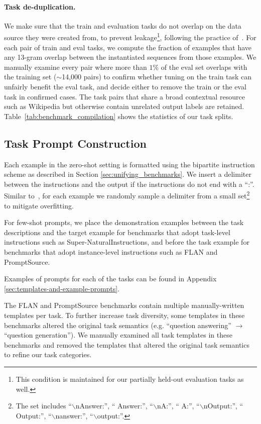 \paragraph{Task de-duplication.} We make sure that the train and evaluation tasks do not overlap on the data source they were created from, to prevent leakage\footnote{This condition is maintained for our partially held-out evaluation tasks as well.}, following the practice of~\cite{wang2022niv2}. For each pair of train and eval tasks, we compute the fraction of examples that have any 13-gram overlap between the instantiated sequences from those examples. We manually examine every pair where more than $1\%$ of the eval set overlaps with the training set ($\sim$14,000 pairs) to confirm whether tuning on the train task can unfairly benefit the eval task, and decide either to remove the train or the eval task in confirmed cases. The task pairs that share a broad contextual resource such as Wikipedia but otherwise contain unrelated output labels are retained. Table~\ref{tab:benchmark_compilation} shows the statistics of our task splits.

\subsection{Task Prompt Construction}

Each example in the zero-shot setting is formatted using the bipartite instruction scheme as described in Section \ref{sec:unifying_benchmarks}. We insert a delimiter between the instructions and the output if the instructions do not end with a ``:''. Similar to~\cite{chung2022flanpalm}, for each example we randomly sample a delimiter from a small set\footnote{The set includes ``$\backslash$nAnswer:'', `` Answer:'', ``$\backslash$nA:'', `` A:'', ``$\backslash$nOutput:'', `` Output:'', ``$\backslash$nanswer:'', ``$\backslash$output:''.} to mitigate overfitting. 

For few-shot prompts, we place the demonstration examples between the task descriptions and the target example for benchmarks that adopt task-level instructions such as Super-NaturalInstructions, and before the task example for benchmarks that adopt instance-level instructions such as FLAN and PromptSource.

Examples of prompts for each of the tasks can be found in Appendix \ref{sec:templates-and-example-prompts}.

The FLAN and PromptSource benchmarks contain multiple manually-written templates per task. To further increase task diversity, some templates in these benchmarks altered the original task semantics (e.g. ``question answering'' $\rightarrow$ ``question generation''). We manually examined all task templates in these benchmarks and removed the templates that altered the original task semantics to refine our task categories.

